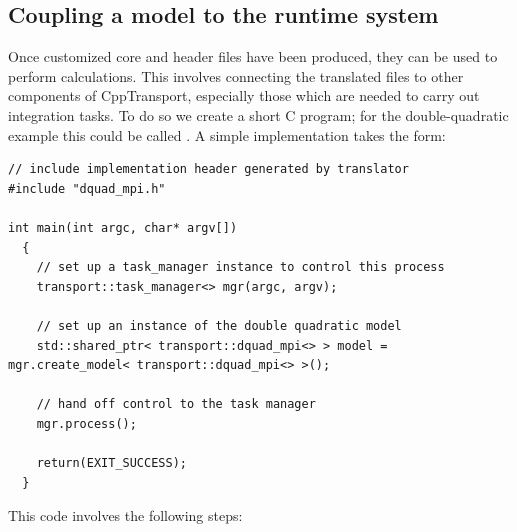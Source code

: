 \documentclass[11pt,a4paper]{article}
\renewcommand{\texttt}[1]{{\ttfamily\fontseries{l}\selectfont{#1}}}
\newcommand{\packagefont}{\sffamily}
\newcommand{\CppTransport}{{\packagefont CppTransport}}
\newcommand{\file}[1]{\texttt{{#1}}}
\newcommand\CC{C\nolinebreak\hspace{-.05em}\raisebox{.4ex}{\relsize{-3}{\textbf{+}}}\nolinebreak\hspace{-.10em}\raisebox{.4ex}{\relsize{-3}{\textbf{+}}}}
\begin{document}
\subsection{Coupling a model to the runtime system}
\label{sec:couple-to-runtime}
Once customized core and header files
have been produced, they can be used to perform
calculations. This involves
connecting the translated
files to other components of
{\CppTransport},
especially those which are needed to carry out integration tasks.
To do so we create a short {\CC} program;
for the double-quadratic example this could be called
\file{dquad.cpp}.
A simple implementation takes the form:
\begin{verbatim}
// include implementation header generated by translator
#include "dquad_mpi.h"

int main(int argc, char* argv[])
  {
    // set up a task_manager instance to control this process
    transport::task_manager<> mgr(argc, argv);

    // set up an instance of the double quadratic model
    std::shared_ptr< transport::dquad_mpi<> > model = mgr.create_model< transport::dquad_mpi<> >();

    // hand off control to the task manager
    mgr.process();

    return(EXIT_SUCCESS);
  }
\end{verbatim}
This code involves the following steps:
\end{document}
